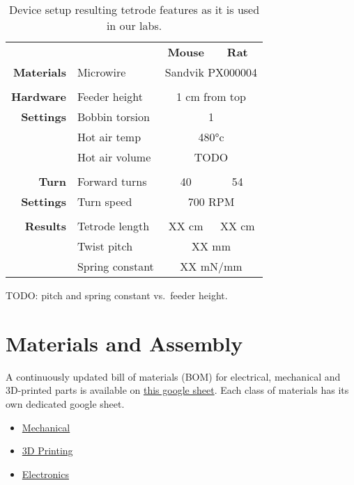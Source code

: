 \documentclass[11pt,a4paper]{article}
\begin{document}
\begin{table}[!htbp]
\centering
\caption{Device setup resulting tetrode features as it is used in our labs.}
\label{t:tetrode_param}

\begin{tabular}{rlcc}
\toprule
&
&
\textbf{Mouse} &
\textbf{Rat} \\
\cmidrule{3-4}
\textbf{Materials}  & Microwire          & \multicolumn{2}{c}{Sandvik PX000004} \\
                    &                    & \\
\textbf{Hardware}   & Feeder height      & \multicolumn{2}{c}{1 cm from top} \\
\textbf{Settings}   & Bobbin torsion     & \multicolumn{2}{c}{1} \\
                    & Hot air temp       & \multicolumn{2}{c}{\ang{480}c} \\
                    & Hot air volume     & \multicolumn{2}{c}{TODO} \\
                    &                    & \\
\textbf{Turn}       & Forward turns      & 40  & 54 \\
\textbf{Settings}   & Turn speed         & \multicolumn{2}{c}{700 RPM} \\
                    &                    & \\
\textbf{Results}    & Tetrode length     & XX cm  & XX cm \\
                    & Twist pitch        & \multicolumn{2}{c}{XX mm} \\
                    & Spring constant    & \multicolumn{2}{c}{XX mN/mm} \\
\bottomrule
\end{tabular}
\end{table}

TODO: pitch and spring constant vs.\ feeder height.


\section{Materials and Assembly}
A continuously updated bill of materials (BOM) for electrical, mechanical and
3D-printed parts is available on
\href{https://docs.google.com/spreadsheets/d/1tdc3wfE6V87q8yqBOQvDj7WylAztkh6_2kuL-YzyB0g/edit#gid=0}{this
google sheet}. Each class of materials has its own dedicated google sheet.

\begin{itemize}[noitemsep]
    \item \href{https://docs.google.com/spreadsheets/d/1tdc3wfE6V87q8yqBOQvDj7WylAztkh6_2kuL-YzyB0g/edit#gid=1299007471}{Mechanical}
    \item \href{https://docs.google.com/spreadsheets/d/1tdc3wfE6V87q8yqBOQvDj7WylAztkh6_2kuL-YzyB0g/edit#gid=587676485}{3D Printing}
    \item \href{https://docs.google.com/spreadsheets/d/1tdc3wfE6V87q8yqBOQvDj7WylAztkh6_2kuL-YzyB0g/edit#gid=0}{Electronics}
\end{itemize}
\end{document}
